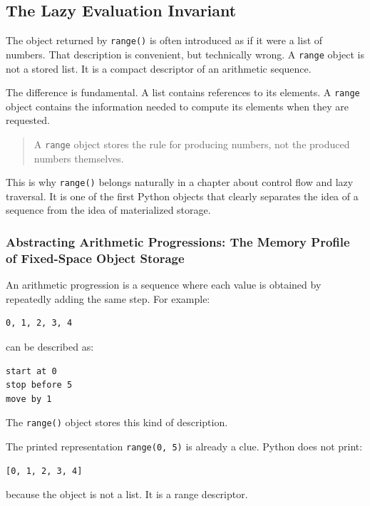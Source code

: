 \subsection{The Lazy Evaluation Invariant}

The object returned by \texttt{range()} is often introduced as if it were a list of numbers. That description is convenient, but technically wrong. A \texttt{range} object is not a stored list. It is a compact descriptor of an arithmetic sequence.

The difference is fundamental. A list contains references to its elements. A \texttt{range} object contains the information needed to compute its elements when they are requested.

\begin{quote}
A \texttt{range} object stores the rule for producing numbers, not the produced numbers themselves.
\end{quote}

This is why \texttt{range()} belongs naturally in a chapter about control flow and lazy traversal. It is one of the first Python objects that clearly separates the idea of a sequence from the idea of materialized storage.

\subsubsection{Abstracting Arithmetic Progressions: The Memory Profile of Fixed-Space Object Storage}

An arithmetic progression is a sequence where each value is obtained by repeatedly adding the same step. For example:

\begin{verbatim}
0, 1, 2, 3, 4
\end{verbatim}

can be described as:

\begin{verbatim}
start at 0
stop before 5
move by 1
\end{verbatim}

The \texttt{range()} object stores this kind of description.

The printed representation \texttt{range(0, 5)} is already a clue. Python does not print:

\begin{verbatim}
[0, 1, 2, 3, 4]
\end{verbatim}

because the object is not a list. It is a range descriptor.


